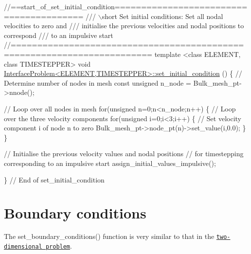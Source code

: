 \begin{DoxyCodeInclude}
\textcolor{comment}{//==start\_of\_set\_initial\_condition========================================}
\textcolor{comment}{/// \(\backslash\)short Set initial conditions: Set all nodal velocities to zero and}
\textcolor{comment}{}\textcolor{comment}{/// initialise the previous velocities and nodal positions to correspond}
\textcolor{comment}{}\textcolor{comment}{/// to an impulsive start}
\textcolor{comment}{}\textcolor{comment}{//========================================================================}
\textcolor{keyword}{template} <\textcolor{keyword}{class} ELEMENT, \textcolor{keyword}{class} TIMESTEPPER>
\textcolor{keywordtype}{void} \hyperlink{classInterfaceProblem_a0d3af8378c4f0a6e38636be958c300d5}{InterfaceProblem<ELEMENT,TIMESTEPPER>::set\_initial\_condition}
      ()
\{
 \textcolor{comment}{// Determine number of nodes in mesh}
 \textcolor{keyword}{const} \textcolor{keywordtype}{unsigned} n\_node = Bulk\_mesh\_pt->nnode();
 
 \textcolor{comment}{// Loop over all nodes in mesh}
 \textcolor{keywordflow}{for}(\textcolor{keywordtype}{unsigned} n=0;n<n\_node;n++)
  \{
   \textcolor{comment}{// Loop over the three velocity components}
   \textcolor{keywordflow}{for}(\textcolor{keywordtype}{unsigned} i=0;i<3;i++)
    \{
     \textcolor{comment}{// Set velocity component i of node n to zero}
     Bulk\_mesh\_pt->node\_pt(n)->set\_value(i,0.0);
    \}
  \}
 
 \textcolor{comment}{// Initialise the previous velocity values and nodal positions}
 \textcolor{comment}{// for timestepping corresponding to an impulsive start}
 assign\_initial\_values\_impulsive();
 
\} \textcolor{comment}{// End of set\_initial\_condition}

\end{DoxyCodeInclude}




 

\hypertarget{index_set_boundary_conditions}{}\section{Boundary conditions}\label{index_set_boundary_conditions}
The {\ttfamily set\+\_\+boundary\+\_\+conditions()} function is very similar to that in the \href{../../../navier_stokes/two_layer_interface/html/index.html#set_boundary_conditions}{\tt two-\/dimensional problem}.


